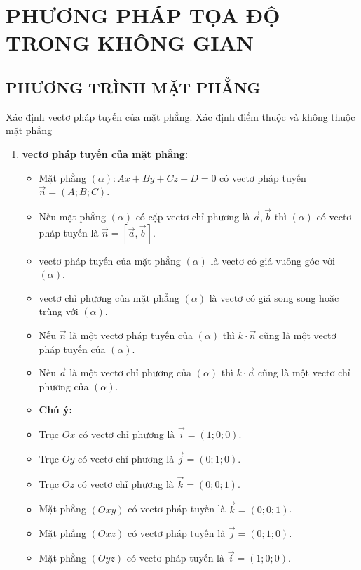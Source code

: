 \chapter{PHƯƠNG PHÁP TỌA ĐỘ TRONG KHÔNG GIAN}
\section{PHƯƠNG TRÌNH MẶT PHẲNG}
\begin{dang}{Xác định vectơ pháp tuyến của mặt phẳng. Xác định điểm thuộc và không thuộc mặt phẳng}
	\begin{enumerate}[label=\bf\arabic*.]
	\item \textbf{vectơ pháp tuyến của mặt phẳng:}
	\begin{itemize}
		\item Mặt phẳng $(\alpha)\colon A x+B y+C z+D=0$ có vectơ pháp tuyến $\overrightarrow{n}=(A; B; C)$.
		\item Nếu mặt phẳng $(\alpha)$ có cặp vectơ chỉ phương là $\overrightarrow{a}, \overrightarrow{b}$ thì $(\alpha)$ có vectơ pháp tuyến là $\overrightarrow{n}=\left[\overrightarrow{a}, \overrightarrow{b}\right]$.
		\item vectơ pháp tuyến của mặt phẳng $(\alpha)$ là vectơ có giá vuông góc với $(\alpha)$.
		\item vectơ chỉ phương của mặt phẳng $(\alpha)$ là vectơ có giá song song hoặc trùng với $(\alpha)$.
		\item Nếu $\overrightarrow{n}$ là một vectơ pháp tuyến của $(\alpha)$ thì $k \cdot \overrightarrow{n}$ cũng là một vectơ pháp tuyến của $(\alpha)$.
		\item Nếu $\overrightarrow{a}$ là một vectơ chỉ phương của $(\alpha)$ thì $k \cdot \overrightarrow{a}$ cũng là một vectơ chỉ phương của $(\alpha)$.
		\item[] \textbf{Chú ý:}
		\item Trục $O x$ có vectơ chỉ phương là $\overrightarrow{i}=(1; 0; 0)$.
		\item Trục $O y$ có vectơ chỉ phương là $\overrightarrow{j}=(0; 1; 0)$.
		\item Trục $O z$ có vectơ chỉ phương là $\overrightarrow{k}=(0; 0; 1)$.
		\item Mặt phẳng $(O x y)$ có vectơ pháp tuyến là $\overrightarrow{k}=(0; 0; 1)$.
		\item Mặt phẳng $(O x z)$ có vectơ pháp tuyến là $\overrightarrow{j}=(0; 1; 0)$.
		\item Mặt phẳng $(O y z)$ có vectơ pháp tuyến là $\overrightarrow{i}=(1; 0; 0)$.

\end{itemize}
\end{enumerate}
\end{dang}
